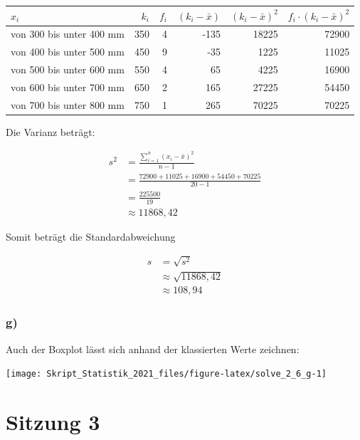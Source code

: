 \documentclass[
  11pt,
  ngerman,
  a4paper,
]{report}
\begin{document}
\begin{table}[H]
\centering
\begin{tabular}{lrrrrr}
\toprule
\textbf{$x_i$} & \textbf{$k_i$} & \textbf{$f_i$} & \textbf{$(k_i - \bar{x})$} & \textbf{$(k_i - \bar{x})^2$} & \textbf{$f_i \cdot (k_i - \bar{x})^2$}\\
\midrule
von 300 bis unter 400 mm & 350 & 4 & -135 & 18225 & 72900\\
von 400 bis unter 500 mm & 450 & 9 & -35 & 1225 & 11025\\
von 500 bis unter 600 mm & 550 & 4 & 65 & 4225 & 16900\\
von 600 bis unter 700 mm & 650 & 2 & 165 & 27225 & 54450\\
von 700 bis unter 800 mm & 750 & 1 & 265 & 70225 & 70225\\
\bottomrule
\end{tabular}
\end{table}

Die Varianz beträgt:

\[\begin{aligned}
  s^2&=\frac{\sum\limits_{i=1}^{n}(x_{i}-\bar{x})^2}{n-1} \\
     &=\frac{72900+11025+16900+54450+70225}{20-1}\\
     &=\frac{225500}{19}\\
     &\approx{11868{,}42}
\end{aligned}\]

Somit beträgt die Standardabweichung

\[\begin{aligned}
  s&=\sqrt{s^2}\\
   &\approx\sqrt{11868{,}42}\\
   &\approx108{,}94
\end{aligned}\]

\hypertarget{g}{%
\subsubsection{g)}\label{g}}

Auch der Boxplot lässt sich anhand der klassierten Werte zeichnen:

\begin{center}\texttt{[image: Skript\_Statistik\_2021\_files/figure-latex/solve\_2\_6\_g-1]} \end{center}

\hypertarget{sitzung-3}{%
\section*{Sitzung 3}\label{sitzung-3}}
\end{document}
